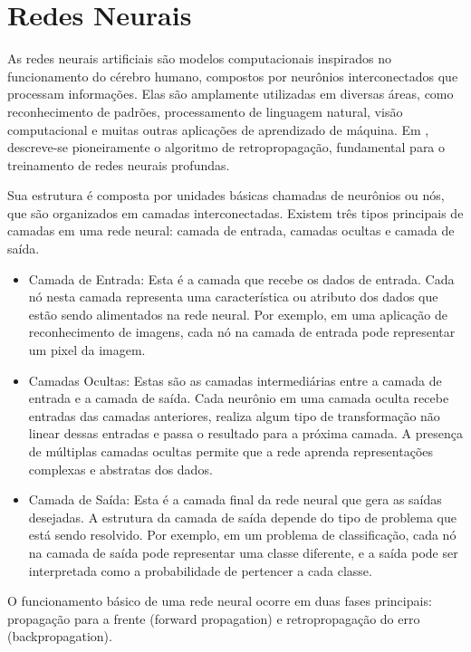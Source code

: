 \section{Redes Neurais}
\label{sec:redesneurais}

As redes neurais artificiais são modelos computacionais inspirados no funcionamento do cérebro humano, compostos por neurônios interconectados que processam informações. Elas são amplamente utilizadas em diversas áreas, como reconhecimento de padrões, processamento de linguagem natural, visão computacional e muitas outras aplicações de aprendizado de máquina. Em , descreve-se pioneiramente o algoritmo de retropropagação, fundamental para o treinamento de redes neurais profundas.

Sua estrutura é composta por unidades básicas chamadas de neurônios ou nós, que são organizados em camadas interconectadas. Existem três tipos principais de camadas em uma rede neural: camada de entrada, camadas ocultas e camada de saída.

\begin{itemize}
\item Camada de Entrada: Esta é a camada que recebe os dados de entrada. Cada nó nesta camada representa uma característica ou atributo dos dados que estão sendo alimentados na rede neural. Por exemplo, em uma aplicação de reconhecimento de imagens, cada nó na camada de entrada pode representar um pixel da imagem.
\item Camadas Ocultas: Estas são as camadas intermediárias entre a camada de entrada e a camada de saída. Cada neurônio em uma camada oculta recebe entradas das camadas anteriores, realiza algum tipo de transformação não linear dessas entradas e passa o resultado para a próxima camada. A presença de múltiplas camadas ocultas permite que a rede aprenda representações complexas e abstratas dos dados.
\item Camada de Saída: Esta é a camada final da rede neural que gera as saídas desejadas. A estrutura da camada de saída depende do tipo de problema que está sendo resolvido. Por exemplo, em um problema de classificação, cada nó na camada de saída pode representar uma classe diferente, e a saída pode ser interpretada como a probabilidade de pertencer a cada classe.
\end{itemize}

O funcionamento básico de uma rede neural ocorre em duas fases principais: propagação para a frente (forward propagation) e retropropagação do erro (backpropagation).

